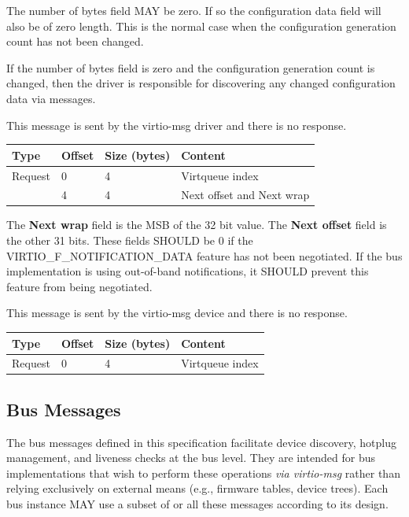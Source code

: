The number of bytes field MAY be zero. If so the configuration data field
will also be of zero length. This is the normal case when the configuration
generation count has not been changed.

If the number of bytes field is zero and the configuration generation count is
changed, then the driver is responsible for discovering any changed
configuration data via  messages.


This message is sent by the virtio-msg driver and there is no response.

\begin{tabular}{|l|l|l|l|}
\hline
Type & Offset & Size (bytes) & Content \\
\hline \hline
Request & 0 & 4 & Virtqueue index \\
& 4 & 4 & Next offset and Next wrap \\
\hline
\end{tabular}

The \textbf{Next wrap} field is the MSB of the 32 bit value. The
\textbf{Next offset} field is the other 31 bits. These fields SHOULD be 0 if
the VIRTIO_F_NOTIFICATION_DATA feature has not been negotiated. If the bus
implementation is using out-of-band notifications, it SHOULD prevent this
feature from being negotiated.


This message is sent by the virtio-msg device and there is no response.

\begin{tabular}{|l|l|l|l|}
\hline
Type & Offset & Size (bytes) & Content \\
\hline \hline
Request & 0 & 4 & Virtqueue index \\
\hline
\end{tabular}

\subsection{Bus Messages}\label{sec:Virtio Transport Options / Virtio Over Messages / Bus Messages}

The bus messages defined in this specification facilitate device discovery,
hotplug management, and liveness checks at the bus level.
They are intended for bus implementations that wish to perform these operations
\emph{via virtio-msg} rather than relying exclusively on external means (e.g.,
firmware tables, device trees). Each bus instance MAY use a subset of or
all these messages according to its design.


